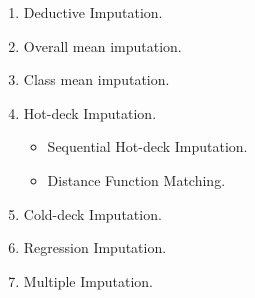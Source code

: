\documentclass{article}
\begin{document}
\begin{enumerate}
\item  Deductive Imputation.
\item  Overall mean imputation.
\item  Class mean imputation.
\item  Hot-deck Imputation.
          \begin{itemize}
          \item  Sequential Hot-deck Imputation.
          \item  Distance Function Matching.
          \end{itemize}
\item  Cold-deck Imputation.
\item  Regression Imputation.
\item  Multiple Imputation.
\end{enumerate}


%
%
%



\end{document}
